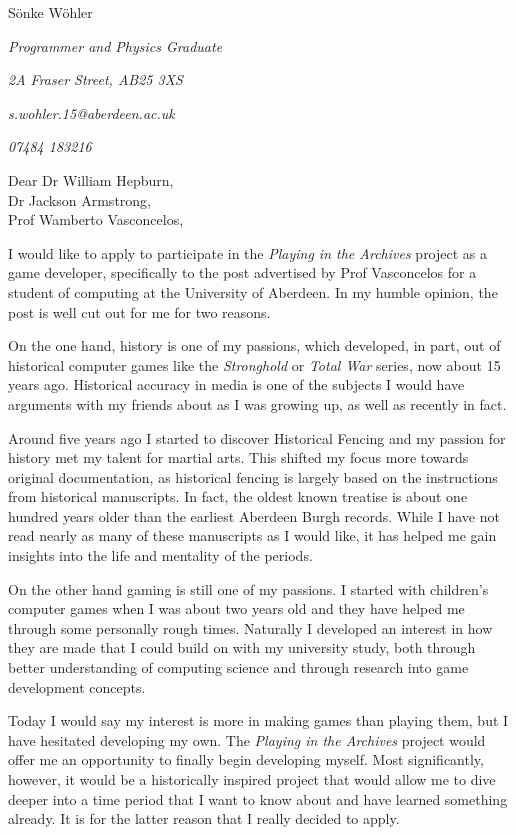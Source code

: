 \documentclass[paper=a4,fontsize=11pt]{scrartcl} %
\newcommand{\sepspace}{\vspace*{1em}}		%
\newcommand{\MyName}[1]{ %
  \Huge \usefont{OT1}{phv}{b}{n} \hfill #1
  \par \normalsize \normalfont}
\newcommand{\MySlogan}[4]{ %
  \large \usefont{OT1}{phv}{m}{n}\hfill \textit{#1} 
  \sepspace
  \par \normalsize \usefont{OT1}{phv}{m}{n}\hfill \textit{#2}
  \par \normalsize \usefont{OT1}{phv}{m}{n}\hfill \textit{#3}
  \par \normalsize \usefont{OT1}{phv}{m}{n}\hfill \textit{#4}
  \par \normalsize \normalfont}
\begin{document}
  
  \MyName{S\"onke W\"ohler}
  \MySlogan{Programmer and Physics Graduate}{2A Fraser Street, AB25 3XS}{s.wohler.15@aberdeen.ac.uk}{07484 183216}
  
  \noindent
  Dear Dr William Hepburn, \\
  Dr Jackson Armstrong, \\
  Prof Wamberto Vasconcelos,
  
  \sepspace
  
    \noindent
    I would like to apply to participate in the \textit{Playing in the Archives} project as a game developer, specifically to the post advertised by Prof Vasconcelos for a student of computing at the University of Aberdeen. In my humble opinion, the post is well cut out for me for two reasons.
    \sepspace
    
    
    \noindent
    On the one hand, history is one of my passions, which developed, in part, out of historical computer games like the \textit{Stronghold} or \textit{Total War} series, now about 15 years ago. Historical accuracy in media is one of the subjects I would have arguments with my friends about as I was growing up, as well as recently in fact. 
    \sepspace
    
    \noindent
    Around five years ago I started to discover Historical Fencing and my passion for history met my talent for martial arts. This shifted my focus more towards original documentation, as historical fencing is largely based on the instructions from historical manuscripts. In fact, the oldest known treatise is about one hundred years older than the earliest Aberdeen Burgh records. While I have not read nearly as many of these manuscripts as I would like, it has helped me gain insights into the life and mentality of the periods.
    \sepspace
    
    
    \noindent
    On the other hand gaming is still one of my passions. I started with children's computer games when I was about two years old and they have helped me through some personally rough times. Naturally I developed an interest in how they are made that I could build on with my university study, both through better understanding of computing science and through research into game development concepts.
    \sepspace
    
    \noindent
    Today I would say my interest is more in making games than playing them, but I have hesitated developing my own. The \textit{Playing in the Archives} project would offer me an opportunity to finally begin developing myself. Most significantly, however, it would be a historically inspired project that would allow me to dive deeper into a time period that I want to know about and have learned something already. It is for the latter reason that I really decided to apply. 
    \sepspace
    
\end{document}
